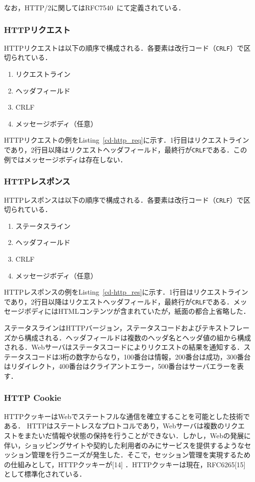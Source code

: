 なお，HTTP/2に関してはRFC7540~\cite{rfc7540}にて定義されている．
\subsubsection{HTTPリクエスト}
HTTPリクエストは以下の順序で構成される．各要素は改行コード（\texttt{CRLF}）で区切られている．
\begin{enumerate}
\item リクエストライン
\item ヘッダフィールド
\item CRLF
\item メッセージボディ（任意）
\end{enumerate}
HTTPリクエストの例をListing~\ref{cd-http_req}に示す．1行目はリクエストラインであり，2行目以降はリクエストヘッダフィールド，最終行が\texttt{CRLF}である．この例ではメッセージボディは存在しない．

\subsubsection{HTTPレスポンス}
HTTPレスポンスは以下の順序で構成される．各要素は改行コード（\texttt{CRLF}）で区切られている．
\begin{enumerate}
\item ステータスライン
\item ヘッダフィールド
\item CRLF
\item メッセージボディ（任意）
\end{enumerate}
HTTPレスポンスの例をListing~\ref{cd-http_res}に示す．1行目はリクエストラインであり，2行目以降はリクエストヘッダフィールド，最終行が\texttt{CRLF}である．メッセージボディにはHTMLコンテンツが含まれていたが，紙面の都合上省略した．

ステータスラインはHTTPバージョン，ステータスコードおよびテキストフレーズから構成される．ヘッダフィールドは複数のヘッダ名とヘッダ値の組から構成される．Webサーバはステータスコードによりリクエストの結果を通知する．ステータスコードは3桁の数字からなり，100番台は情報，200番台は成功，300番台はリダイレクト，400番台はクライアントエラー，500番台はサーバエラーを表す．
\subsubsection{HTTP Cookie}
HTTPクッキーはWebでステートフルな通信を確立することを可能とした技術である．
HTTPはステートレスなプロトコルであり，Webサーバは複数のリクエストをまたいだ情報や状態の保持を行うことができない．しかし，Webの発展に伴い，ショッピングサイトや契約した利用者のみにサービスを提供するようなセッション管理を行うニーズが発生した．そこで，セッション管理を実現するための仕組みとして，HTTPクッキーが[14] ．HTTPクッキーは現在，RFC6265[15] として標準化されている． 

